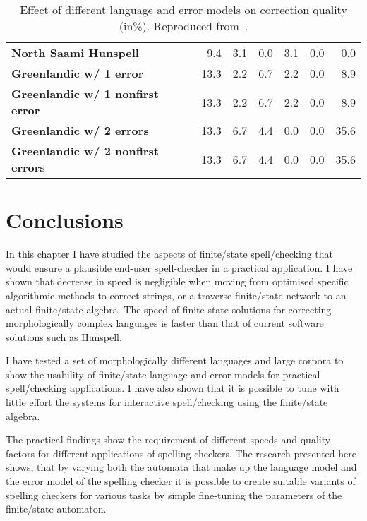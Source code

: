 \documentclass[officiallayout,final]{unihelcompling}
\begin{document}
\begin{table}
\begin{tabular}{|l|r|r|r|r|r|r|}
        \hline
        \bf North Saami Hunspell & 9.4 & 3.1 & 0.0 & 3.1 & 0.0 & 0.0 \\
          \bf Greenlandic w/ 1 error & 13.3 & 2.2 & 6.7 & 2.2 & 0.0 & 8.9 \\
 \bf Greenlandic w/ 1 nonfirst error & 13.3 & 2.2 & 6.7 & 2.2 & 0.0 & 8.9 \\
         \bf Greenlandic w/ 2 errors & 13.3 & 6.7 & 4.4 & 0.0 & 0.0 & 35.6 \\
\bf Greenlandic w/ 2 nonfirst errors & 13.3 & 6.7 & 4.4 & 0.0 & 0.0 & 35.6 \\
        \hline
    \end{tabular}

    \caption{Effect of different language and error models on correction 
        quality (in\%). Reproduced from~.
    \label{table:nejlt-2013-repro}}
\end{table}

\section{Conclusions}

In this chapter I have studied the aspects of finite\-/state spell\-/checking
that would ensure a plausible end-user spell-checker in a practical application. I
have shown that decrease in speed is negligible when moving from
optimised specific algorithmic methods to correct strings, or a traverse
finite\-/state network to an actual finite\-/state algebra. The
speed of finite-state solutions for correcting morphologically complex
languages is faster than that of current software solutions such as Hunspell.

I have tested a set of morphologically different languages and large corpora to
show the usability of finite\-/state language and error-models for practical
spell\-/checking applications. I have also shown that it is possible to tune
with little effort the systems for interactive spell\-/checking using the
finite\-/state algebra.

The practical findings show the requirement of different speeds and quality
factors for different applications of spelling checkers. The research
presented here shows, that by varying both the automata that make up the
language model and the error model of the spelling checker it is possible to
create suitable variants of spelling checkers for various tasks by simple
fine-tuning the parameters of the finite\-/state automaton.
\end{document}
